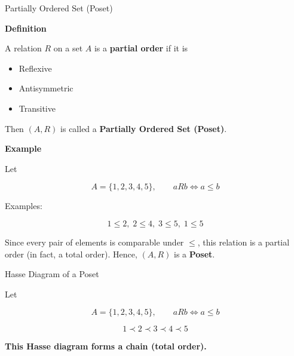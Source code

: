 \documentclass[aspectratio=169]{beamer}
\begin{document}
\begin{frame}{Partially Ordered Set (Poset)}

\textbf{Definition}

A relation \(R\) on a set \(A\) is a \textbf{partial order} if it is

\begin{itemize}
\item Reflexive
\item Antisymmetric
\item Transitive
\end{itemize}

Then \((A,R)\) is called a \textbf{Partially Ordered Set (Poset)}.

\vspace{0.2cm}

\textbf{Example}

Let

\[
A=\{1,2,3,4,5\},\qquad
aRb \iff a\le b
\]

Examples:

\[
1\le2,\;
2\le4,\;
3\le5,\;
1\le5
\]

Since every pair of elements is comparable under \(\le\), this relation is a partial order (in fact, a total order).
Hence, \((A,R)\) is a \textbf{Poset}.

\end{frame}
\begin{frame}{Hasse Diagram of a Poset}

Let

\[
A=\{1,2,3,4,5\},\qquad aRb\iff a\le b
\]

\begin{center}


\end{center}

\[
1\prec2\prec3\prec4\prec5
\]

\centering
\textbf{This Hasse diagram forms a chain (total order).}

\end{frame}
\end{document}
